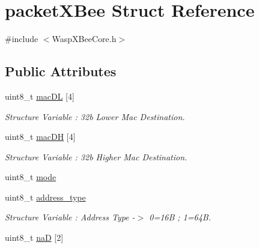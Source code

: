 \hypertarget{structpacket_x_bee}{}\section{packet\+X\+Bee Struct Reference}
\label{structpacket_x_bee}


{\ttfamily \#include $<$Wasp\+X\+Bee\+Core.\+h$>$}

\subsection*{Public Attributes}
\begin{DoxyCompactItemize}
\item 
uint8\+\_\+t \hyperlink{structpacket_x_bee_af360bbcf64077cb290cf62b1d24cadf5}{mac\+DL} \mbox{[}4\mbox{]}\hypertarget{structpacket_x_bee_af360bbcf64077cb290cf62b1d24cadf5}{}\label{structpacket_x_bee_af360bbcf64077cb290cf62b1d24cadf5}

\begin{DoxyCompactList}\small\item\em Structure Variable \+: 32b Lower Mac Destination. \end{DoxyCompactList}\item 
uint8\+\_\+t \hyperlink{structpacket_x_bee_a822600fecb91c7bbe8ad271d3e4aa44a}{mac\+DH} \mbox{[}4\mbox{]}\hypertarget{structpacket_x_bee_a822600fecb91c7bbe8ad271d3e4aa44a}{}\label{structpacket_x_bee_a822600fecb91c7bbe8ad271d3e4aa44a}

\begin{DoxyCompactList}\small\item\em Structure Variable \+: 32b Higher Mac Destination. \end{DoxyCompactList}\item 
uint8\+\_\+t \hyperlink{structpacket_x_bee_ac730f3c445ec495b71054a8ccad72f4a}{mode}
\item 
uint8\+\_\+t \hyperlink{structpacket_x_bee_a8046b3e055fdda7a0c0c65dfda5bfbed}{address\+\_\+type}
\begin{DoxyCompactList}\small\item\em Structure Variable \+: Address Type -\/$>$ 0=16B ; 1=64B. \end{DoxyCompactList}\item 
uint8\+\_\+t \hyperlink{structpacket_x_bee_a9682eaddcde331acfb56ee492763697e}{naD} \mbox{[}2\mbox{]}\hypertarget{structpacket_x_bee_a9682eaddcde331acfb56ee492763697e}{}\label{structpacket_x_bee_a9682eaddcde331acfb56ee492763697e}


\end{DoxyCompactItemize}
